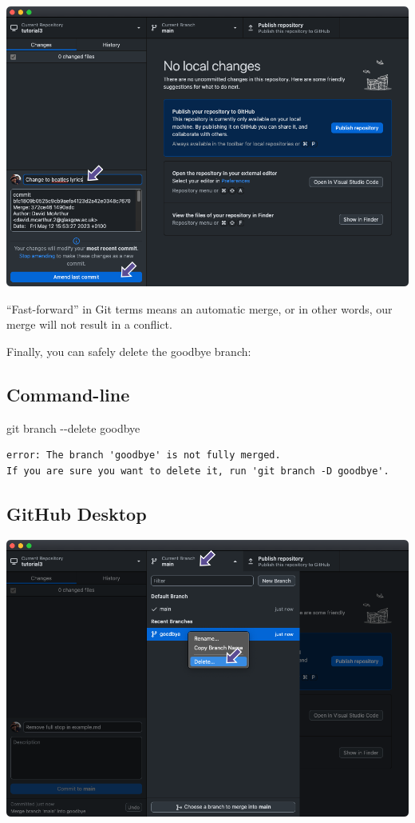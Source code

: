 \documentclass[
  letterpaper,
  DIV=11,
  numbers=noendperiod]{scrartcl}
\newenvironment{Shaded}{\begin{snugshade}}{\end{snugshade}}
\newcommand{\AttributeTok}[1]{\textcolor[rgb]{0.40,0.45,0.13}{#1}}
\newcommand{\FunctionTok}[1]{\textcolor[rgb]{0.28,0.35,0.67}{#1}}
\newcommand{\NormalTok}[1]{\textcolor[rgb]{0.00,0.23,0.31}{#1}}
\begin{document}
\includegraphics{images/image75.png}

``Fast-forward'' in Git terms means an automatic merge, or in other
words, our merge will not result in a conflict.

Finally, you can safely delete the goodbye branch:

\subsection{Command-line}

\begin{Shaded}
\begin{Highlighting}[]
\FunctionTok{git}\NormalTok{ branch }\AttributeTok{{-}{-}delete}\NormalTok{ goodbye}
\end{Highlighting}
\end{Shaded}

\begin{verbatim}
error: The branch 'goodbye' is not fully merged.
If you are sure you want to delete it, run 'git branch -D goodbye'.
\end{verbatim}

\subsection{GitHub Desktop}

\includegraphics{images/image76.png}
\end{document}

